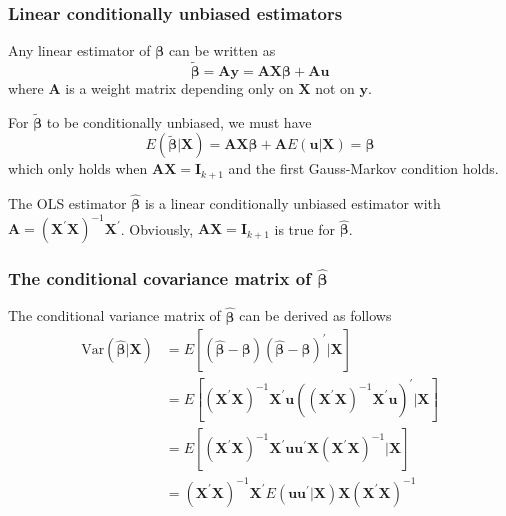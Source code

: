 \documentclass[a4paper,11pt]{article}
\newcommand{\var}{\mathrm{Var}}
\begin{document}
\subsubsection*{Linear conditionally unbiased estimators}
\label{sec:orgc2133cb}

Any linear estimator of \(\boldsymbol{\beta}\) can be written as
\[ \tilde{\boldsymbol{\beta}} = \mathbf{Ay} = \mathbf{AX}\boldsymbol{\beta} + \mathbf{Au} \]
where \(\mathbf{A}\) is a weight matrix depending only on \(\mathbf{X}\)
not on \(\mathbf{y}\).

For \(\tilde{\boldsymbol{\beta}}\) to be conditionally unbiased, we must
have
\begin{equation*}
E(\tilde{\boldsymbol{\beta}} | \mathbf{X}) = \mathbf{AX} \boldsymbol{\beta} + \mathbf{A} E(\mathbf{u} | \mathbf{X}) = \boldsymbol{\beta}
\end{equation*}
which only holds when \(\mathbf{AX} = \mathbf{I}_{k+1}\) and the first
Gauss-Markov condition holds.

The OLS estimator \(\hat{\boldsymbol{\beta}}\) is a linear conditionally
unbiased estimator with \(\mathbf{A} = \left(\mathbf{X}^{\prime}
\mathbf{X}\right)^{-1} \mathbf{X}^{\prime}\). Obviously, \(\mathbf{AX} =
\mathbf{I}_{k+1}\) is true for \(\hat{\boldsymbol{\beta}}\).

\subsubsection*{The conditional covariance matrix of \(\hat{\boldsymbol{\beta}}\)}
\label{sec:org95c099a}

The conditional variance matrix of \(\hat{\boldsymbol{\beta}}\) can be
derived as follows
\begin{equation*}
\begin{split}
\var(\hat{\boldsymbol{\beta}} | \mathbf{X}) &= E\left[ (\hat{\boldsymbol{\beta}} - \boldsymbol{\beta})(\hat{\boldsymbol{\beta}} - \boldsymbol{\beta})^{\prime} | \mathbf{X}\right] \\
&= E\left[ \left(\mathbf{X}^{\prime} \mathbf{X}\right)^{-1} \mathbf{X}^{\prime} \mathbf{u} \left(\left(\mathbf{X}^{\prime} \mathbf{X}\right)^{-1} \mathbf{X}^{\prime} \mathbf{u} \right)^{\prime} | \mathbf{X} \right] \\
&= E\left[ \left(\mathbf{X}^{\prime} \mathbf{X}\right)^{-1} \mathbf{X}^{\prime} \mathbf{u} \mathbf{u}^{\prime} \mathbf{X} (\mathbf{X}^{\prime} \mathbf{X})^{-1} | \mathbf{X} \right] \\
&= \left(\mathbf{X}^{\prime} \mathbf{X}\right)^{-1} \mathbf{X}^{\prime} E(\mathbf{uu}^{\prime} | \mathbf{X}) \mathbf{X} (\mathbf{X}^{\prime} \mathbf{X})^{-1}
\end{split}
\end{equation*}
\end{document}
